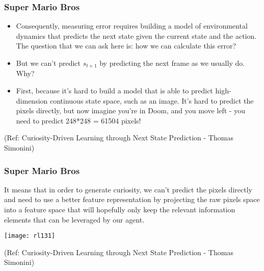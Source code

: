 \begin{frame}[fragile]\frametitle{Super Mario Bros}


\begin{itemize}
\item Consequently, measuring error requires building a model of environmental dynamics that predicts the next state given the current state and the action. The question that we can ask here is: how we can calculate this error?
\item But we can't predict $s_{t+1}$ by predicting the next frame as we usually do. Why?
\item First, because it's hard to build a model that is able to predict high-dimension continuous state space, such as an image. It's hard to predict the pixels directly, but now imagine you're in Doom, and you move left - you need to predict 248*248 = 61504 pixels!
\end{itemize}

{\tiny (Ref: Curiosity-Driven Learning through Next State Prediction - Thomas Simonini)}


\end{frame}

\begin{frame}[fragile]\frametitle{Super Mario Bros}


It means that in order to generate curiosity, we can't predict the pixels directly and need to use a better feature representation by projecting the raw pixels space into a feature space that will hopefully only keep the relevant information elements that can be leveraged by our agent.


\begin{center}
\texttt{[image: rl131]}
\end{center}

{\tiny (Ref: Curiosity-Driven Learning through Next State Prediction - Thomas Simonini)}


\end{frame}

